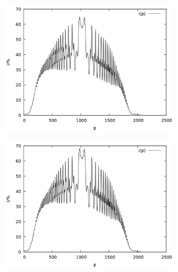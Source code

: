 \begin{figure}
\begin{subfigure}{0.45\textwidth}
\includegraphics[width=\textwidth]{data/zeeman/out_7_2_raw.png}
\end{subfigure}
\begin{subfigure}{0.45\textwidth}
\includegraphics[width=\textwidth]{data/zeeman/out_7_5_raw.png}
\end{subfigure}
\begin{subfigure}{0.45\textwidth}

\end{subfigure}
\end{figure}
